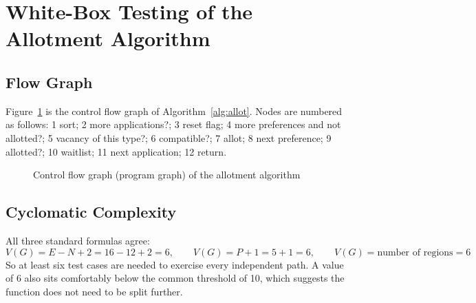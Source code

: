 \documentclass[11pt,a4paper]{report}
\begin{document}
\section{White-Box Testing of the Allotment Algorithm}
\subsection{Flow Graph}
Figure~\ref{fig:flowgraph} is the control flow graph of Algorithm~\ref{alg:allot}. Nodes are numbered as follows: 1 sort; 2 more applications?; 3 reset flag; 4 more preferences and not allotted?; 5 vacancy of this type?; 6 compatible?; 7 allot; 8 next preference; 9 allotted?; 10 waitlist; 11 next application; 12 return.

\begin{figure}[!htbp]
\centering
{}
\caption{Control flow graph (program graph) of the allotment algorithm}\label{fig:flowgraph}
\end{figure}

\subsection{Cyclomatic Complexity}
All three standard formulas agree:
\[
V(G) = E - N + 2 = 16 - 12 + 2 = 6, \qquad V(G) = P + 1 = 5 + 1 = 6, \qquad V(G) = \text{number of regions} = 6
\]
So at least six test cases are needed to exercise every independent path. A value of 6 also sits comfortably below the common threshold of 10, which suggests the function does not need to be split further.
\end{document}
